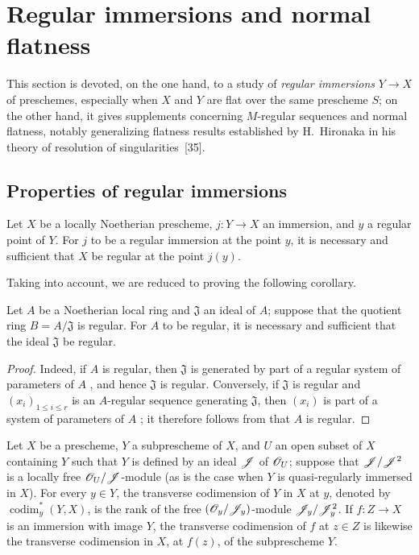 \section{Regular immersions and normal flatness}
\label{section:IV.19}

This section is devoted, on the one hand, to a study of \emph{regular immersions}  $Y\to X$ of preschemes, especially when $X$ and $Y$ are flat over the same prescheme $S$; on the other hand, it gives supplements concerning $M$-regular sequences and normal flatness, notably generalizing flatness results established by H.~Hironaka in his theory of resolution of singularities~[35].


\subsection{Properties of regular immersions}
\label{subsection:IV.19.1}


\begin{proposition}[19.1.1]
\label{IV.19.1.1}
Let $X$ be a locally Noetherian prescheme, $j:Y\to X$ an immersion, and $y$ a regular point of $Y$. For $j$ to be a regular immersion at the point $y$, it is necessary and sufficient that $X$ be regular at the point $j(y)$.
\end{proposition}

Taking  into account, we are reduced to proving the following corollary.

\begin{corollary}[19.1.2]
\label{IV.19.1.2}
Let $A$ be a Noetherian local ring and $\mathfrak J$ an ideal of $A$; suppose that the quotient ring $B=A/\mathfrak J$ is regular. For $A$ to be regular, it is necessary and sufficient that the ideal $\mathfrak J$ be regular.
\end{corollary}

\begin{proof}
Indeed, if $A$ is regular, then $\mathfrak J$ is generated by part of a regular system of parameters of $A$ , and hence $\mathfrak J$ is regular. Conversely, if $\mathfrak J$ is regular and $(x_i)_{1\leq i\leq r}$ is an $A$-regular sequence generating $\mathfrak J$, then $(x_i)$ is part of a system of parameters of $A$ ; it therefore follows from  that $A$ is regular.
\end{proof}

\begin{definition}[19.1.3]
\label{IV.19.1.3}
Let $X$ be a prescheme, $Y$ a subprescheme of $X$, and $U$ an open subset of $X$ containing $Y$ such that $Y$ is defined by an ideal $\mathscr{J}$ of $\mathscr{O}_U$; suppose that $\mathscr{J}/\mathscr{J}^2$ is a locally free $\mathscr{O}_U/\mathscr{J}$-module \textup{(as is the case when $Y$ is quasi-regularly immersed in $X$)}. For every $y\in Y$, the transverse codimension of $Y$ in $X$ at $y$, denoted by $\operatorname{codim}_y^*(Y,X)$, is the rank of the free $(\mathscr{O}_y/\mathscr{J}_y)$-module $\mathscr{J}_y/\mathscr{J}_y^2$. If $f:Z\to X$ is an immersion with image $Y$, the transverse codimension of $f$ at $z\in Z$ is likewise the transverse codimension in $X$, at $f(z)$, of the subprescheme $Y$.
\end{definition}

